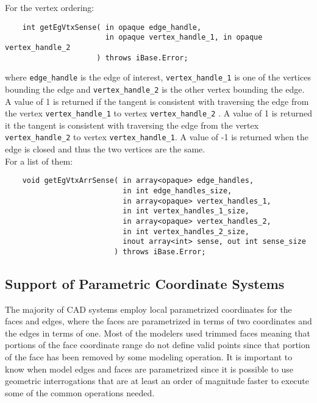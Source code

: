 \documentclass{article}
\begin{document}
\hspace{-16pt}For the vertex ordering:

\begin{verbatim}
    int getEgVtxSense( in opaque edge_handle, 
                       in opaque vertex_handle_1, in opaque vertex_handle_2
                     ) throws iBase.Error;
\end{verbatim}
where {\tt edge\_handle} is the edge of interest, {\tt vertex\_handle\_1} is 
one of the vertices bounding the edge and {\tt vertex\_handle\_2} is 
the other vertex bounding the edge. A value of 1 is returned 
if the tangent is consistent with traversing the edge from the 
vertex {\tt vertex\_handle\_1} to vertex {\tt vertex\_handle\_2} . 
A value of 1 is returned it the tangent is consistent with traversing 
the edge from the vertex {\tt vertex\_handle\_2} to vertex {\tt vertex\_handle\_1}. 
A value of -1 is returned when the edge is closed and thus the 
two vertices are the same.\\

\hspace{-16pt}For a list of them:

\begin{verbatim}
    void getEgVtxArrSense( in array<opaque> edge_handles, 
                           in int edge_handles_size, 
                           in array<opaque> vertex_handles_1, 
                           in int vertex_handles_1_size, 
                           in array<opaque> vertex_handles_2, 
                           in int vertex_handles_2_size, 
                           inout array<int> sense, out int sense_size
                         ) throws iBase.Error;
\end{verbatim}

\subsection{Support of Parametric Coordinate Systems}
The majority of CAD systems employ local parametrized coordinates 
for the faces and edges, where the faces are parametrized in 
terms of two coordinates and the edges in terms of one. Most 
of the modelers used trimmed faces meaning that portions of the 
face coordinate range do not define valid points since that portion 
of the face has been removed by some modeling operation. It is 
important to know when model edges and faces are parametrized 
since it is possible to use geometric interrogations that are 
at least an order of magnitude faster to execute some of the 
common operations needed.\\
\end{document}
